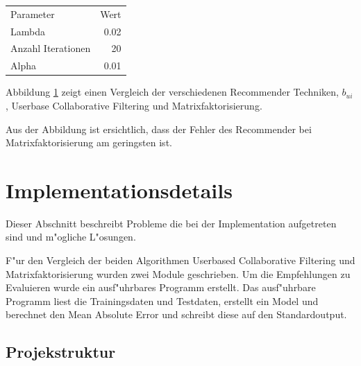 \documentclass[a4paper, 12pt]{article}
\begin{document}
\begin{center}
\begin{tabular}{lr}
 Parameter           &  Wert  \\
 Lambda              &  0.02  \\
 Anzahl Iterationen  &    20  \\
 Alpha               &  0.01  \\
\end{tabular}
\end{center}

Abbildung \ref{fig:compare} zeigt einen Vergleich der verschiedenen Recommender Techniken, $b_{ui}$, Userbase Collaborative Filtering und Matrixfaktorisierung.

\begin{figure}
\centering
\label{fig:compare}
\caption{}
\end{figure}

Aus der Abbildung ist ersichtlich, dass der Fehler des Recommender bei Matrixfaktorisierung am geringsten ist.

\section{Implementationsdetails}
\label{sec:ram}

Dieser Abschnitt beschreibt Probleme die bei der Implementation aufgetreten sind und m"ogliche L"osungen.

F"ur den Vergleich der beiden Algorithmen Userbased Collaborative Filtering und Matrixfaktorisierung wurden zwei Module geschrieben. Um die Empfehlungen zu Evaluieren wurde ein ausf"uhrbares Programm erstellt. Das ausf"uhrbare Programm liest die Trainingsdaten und Testdaten, erstellt ein Model und berechnet den Mean Absolute Error und schreibt diese auf den Standardoutput.


\subsection{Projekstruktur}
\label{sec:structur}
\end{document}
